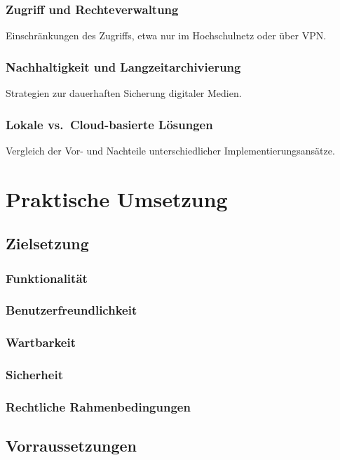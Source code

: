 \documentclass[12pt,a4paper]{report}
\begin{document}
  \subsection{Zugriff und Rechteverwaltung}
  Einschränkungen des Zugriffs, etwa nur im Hochschulnetz oder über VPN.

  \subsection{Nachhaltigkeit und Langzeitarchivierung}
  Strategien zur dauerhaften Sicherung digitaler Medien.

  \subsection{Lokale vs.\ Cloud-basierte Lösungen}
  Vergleich der Vor- und Nachteile unterschiedlicher Implementierungsansätze.

\chapter*{Praktische Umsetzung}
\setcounter{section}{0}

\section{Zielsetzung}
  \subsection{Funktionalität}
  \subsection{Benutzerfreundlichkeit}
  \subsection{Wartbarkeit}
  \subsection{Sicherheit}
  \subsection{Rechtliche Rahmenbedingungen}
\section{Vorraussetzungen}
\end{document}

